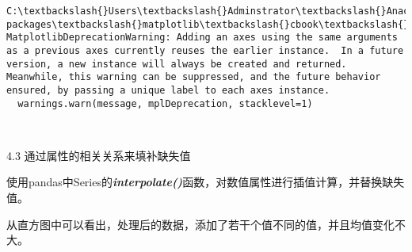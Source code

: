 \documentclass[11pt]{article}
\begin{document}
    \begin{Verbatim}[commandchars=\\\{\}]
C:\textbackslash{}Users\textbackslash{}Adminstrator\textbackslash{}Anaconda3\textbackslash{}lib\textbackslash{}site-packages\textbackslash{}matplotlib\textbackslash{}cbook\textbackslash{}deprecation.py:107: MatplotlibDeprecationWarning: Adding an axes using the same arguments as a previous axes currently reuses the earlier instance.  In a future version, a new instance will always be created and returned.  Meanwhile, this warning can be suppressed, and the future behavior ensured, by passing a unique label to each axes instance.
  warnings.warn(message, mplDeprecation, stacklevel=1)

    \end{Verbatim}

    \begin{center}
    \end{center}
    { \hspace*{\fill} \\}
    
    4.3 通过属性的相关关系来填补缺失值

使用pandas中Series的\textbf{\emph{interpolate()}}函数，对数值属性进行插值计算，并替换缺失值。

从直方图中可以看出，处理后的数据，添加了若干个值不同的值，并且均值变化不大。
\end{document}
